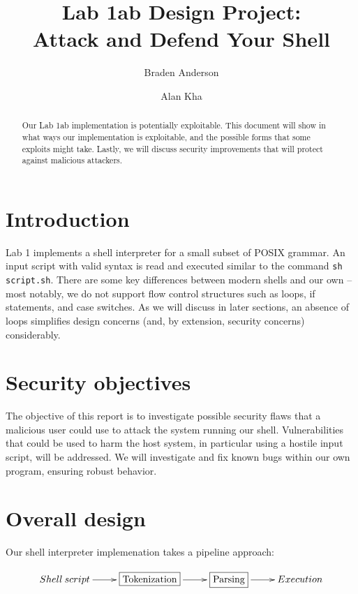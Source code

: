 \documentclass[12pt]{article}
\begin{document}
\lstset{language=C}

\title{Lab 1ab Design Project:\\ Attack and Defend Your Shell}
\author[1]{Braden Anderson}
\author[2]{Alan Kha}

\maketitle

\begin{abstract}
Our Lab 1ab implementation is potentially exploitable. This document will show in what ways our implementation is exploitable, and the possible forms that some exploits might take. Lastly, we will discuss security improvements that will protect against malicious attackers.
\end{abstract}

\section{Introduction}
Lab 1 implements a shell interpreter for a small subset of POSIX grammar. An input script with valid syntax is read and executed similar to the command \texttt{sh script.sh}. There are some key differences between modern shells and our own -- most notably, we do not support flow control structures such as loops, if statements, and case switches. As we will discuss in later sections, an absence of loops simplifies design concerns (and, by extension, security concerns) considerably.

\section{Security objectives}
The objective of this report is to investigate possible security flaws that a malicious user could use to attack the system running our shell. Vulnerabilities that could be used to harm the host system, in particular using a hostile input script, will be addressed. We will investigate and fix known bugs within our own program, ensuring robust behavior.


\section{Overall design}
Our shell interpreter implemenation takes a pipeline approach:

\begin{displaymath}
\xymatrix{
Shell \: script \ar[r] & \framebox{Tokenization} \ar[r] & \framebox{Parsing} \ar[r] & Execution
}
\end{displaymath}
\end{document}
